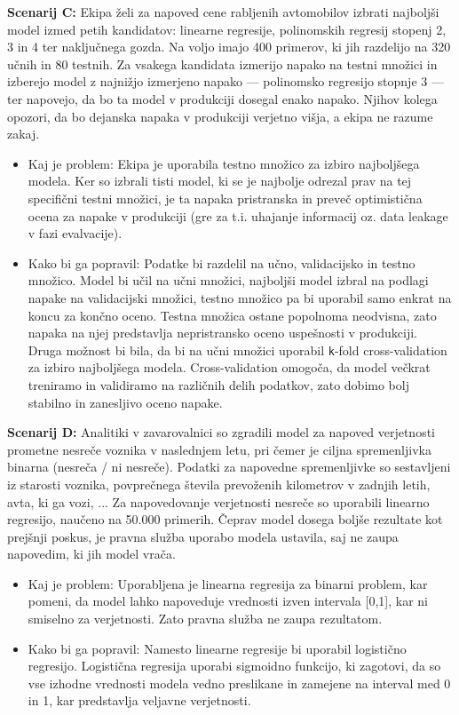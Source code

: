 ﻿\documentclass[12pt,a4paper]{article}
\begin{document}
\textbf{Scenarij C:} Ekipa želi za napoved cene rabljenih avtomobilov izbrati najboljši model izmed petih kandidatov: linearne regresije, polinomskih regresij stopenj 2, 3 in 4 ter naključnega gozda. Na voljo imajo 400 primerov, ki jih razdelijo na 320 učnih in 80 testnih. Za vsakega kandidata izmerijo napako na testni množici in izberejo model z najnižjo izmerjeno napako --- polinomsko regresijo stopnje 3 --- ter napovejo, da bo ta model v produkciji dosegal enako napako. Njihov kolega opozori, da bo dejanska napaka v produkciji verjetno višja, a ekipa ne razume zakaj.

\begin{itemize}
    \item Kaj je problem: Ekipa je uporabila testno množico za izbiro najboljšega modela. Ker so izbrali tisti model, ki se je najbolje odrezal prav na tej specifični testni množici, je ta napaka pristranska in preveč optimistična ocena za napake v produkciji (gre za t.i. uhajanje informacij oz. data leakage v fazi evalvacije).
    \item Kako bi ga popravil: Podatke bi razdelil na učno, validacijsko in testno množico. Model bi učil na učni množici, najboljši model izbral na podlagi napake na validacijski množici, testno množico pa bi uporabil samo enkrat na koncu za končno oceno. Testna množica ostane popolnoma neodvisna, zato napaka na njej predstavlja nepristransko oceno uspešnosti v produkciji. Druga možnost bi bila, da bi na učni množici uporabil \texttt{k}-fold cross-validation za izbiro najboljšega modela. Cross-validation omogoča, da model večkrat treniramo in validiramo na različnih delih podatkov, zato dobimo bolj stabilno in zanesljivo oceno napake.
\end{itemize}

\textbf{Scenarij D:} Analitiki v zavarovalnici so zgradili model za napoved verjetnosti prometne nesreče voznika v naslednjem letu, pri čemer je ciljna spremenljivka binarna (nesreča / ni nesreče). Podatki za napovedne spremenljivke so sestavljeni iz starosti voznika, povprečnega števila prevoženih kilometrov v zadnjih letih, avta, ki ga vozi, ... Za napovedovanje verjetnosti nesreče so uporabili linearno regresijo, naučeno na 50.000 primerih. Čeprav model dosega boljše rezultate kot prejšnji poskus, je pravna služba uporabo modela ustavila, saj ne zaupa napovedim, ki jih model vrača.

\begin{itemize}
    \item Kaj je problem: Uporabljena je linearna regresija za binarni problem, kar pomeni, da model lahko napoveduje vrednosti izven intervala [0,1], kar ni smiselno za verjetnosti. Zato pravna služba ne zaupa rezultatom.
    \item Kako bi ga popravil: Namesto linearne regresije bi uporabil logistično regresijo. Logistična regresija uporabi sigmoidno funkcijo, ki zagotovi, da so vse izhodne vrednosti modela vedno preslikane in zamejene na interval med 0 in 1, kar predstavlja veljavne verjetnosti.
\end{itemize}
\end{document}
